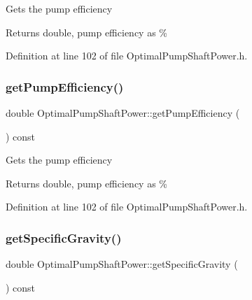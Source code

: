 Gets the pump efficiency \begin{DoxyReturn}{Returns}
double, pump efficiency as \% 
\end{DoxyReturn}


Definition at line 102 of file Optimal\+Pump\+Shaft\+Power.\+h.

\mbox{\label{class_optimal_pump_shaft_power_a77b9c639438f9d6008c20948f173a2c4}} 
\subsubsection{\texorpdfstring{get\+Pump\+Efficiency()}{getPumpEfficiency()}\hspace{0.1cm}{\footnotesize\ttfamily [3/3]}}
{\footnotesize\ttfamily double Optimal\+Pump\+Shaft\+Power\+::get\+Pump\+Efficiency (\begin{DoxyParamCaption}{ }\end{DoxyParamCaption}) const\hspace{0.3cm}{\ttfamily [inline]}}

Gets the pump efficiency \begin{DoxyReturn}{Returns}
double, pump efficiency as \% 
\end{DoxyReturn}


Definition at line 102 of file Optimal\+Pump\+Shaft\+Power.\+h.

\mbox{\label{class_optimal_pump_shaft_power_a607d32c56edece639e03007adc1bf325}} 
\subsubsection{\texorpdfstring{get\+Specific\+Gravity()}{getSpecificGravity()}\hspace{0.1cm}{\footnotesize\ttfamily [1/3]}}
{\footnotesize\ttfamily double Optimal\+Pump\+Shaft\+Power\+::get\+Specific\+Gravity (\begin{DoxyParamCaption}{ }\end{DoxyParamCaption}) const\hspace{0.3cm}{\ttfamily [inline]}}

